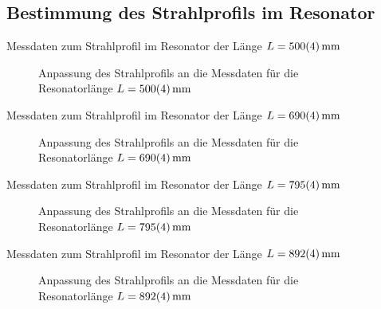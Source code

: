 \documentclass[11pt, a4paper]{article}
\numberwithin{equation}{section}
\begin{document}
\begin{appendix}
\subsection{Bestimmung des Strahlprofils im Resonator}
\label{app:strahlprofil}
\FloatBarrier
\begin{table}[ht]
	\centering
	
	\caption{Messdaten zum Strahlprofil im Resonator der Länge $L = \SI{500 +- 4}{\milli\metre}$}
	\label{tab:strahlradius_50}
\end{table}
\begin{figure}[hb]
	\centering
	
	\caption{Anpassung des Strahlprofils an die Messdaten für die Resonatorlänge $L = \SI{500 +- 4}{\milli\metre}$}
	\label{fig:strahlradius_50}
\end{figure}
\clearpage
\begin{table}[t]
	\centering
	
	\caption{Messdaten zum Strahlprofil im Resonator der Länge $L = \SI{690 +- 4}{\milli\metre}$}
	\label{tab:strahlradius_70}
\end{table}
\begin{figure}[b]
	\centering
	
	\caption{Anpassung des Strahlprofils an die Messdaten für die Resonatorlänge $L = \SI{690 +- 4}{\milli\metre}$}
	\label{fig:strahlradius_70}
\end{figure}
\clearpage
\begin{table}[t]
	\centering
	
	\caption{Messdaten zum Strahlprofil im Resonator der Länge $L = \SI{795 +- 4}{\milli\metre}$}
	\label{tab:strahlradius_80}
\end{table}
\begin{figure}[b]
	\centering
	
	\caption{Anpassung des Strahlprofils an die Messdaten für die Resonatorlänge $L = \SI{795 +- 4}{\milli\metre}$}
	\label{fig:strahlradius_80}
\end{figure}
\FloatBarrier
\begin{table}[t]
	\centering
	
	\caption{Messdaten zum Strahlprofil im Resonator der Länge $L = \SI{892 +- 4}{\milli\metre}$}
	\label{tab:strahlradius_90}
\end{table}
\begin{figure}[b]
	\centering
	
	\caption{Anpassung des Strahlprofils an die Messdaten für die Resonatorlänge $L = \SI{892 +- 4}{\milli\metre}$}
	\label{fig:strahlradius_90}
\end{figure}
\clearpage


\end{appendix}
\end{document}
